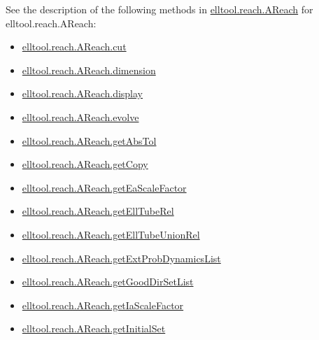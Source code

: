 \documentclass[letterpaper,10pt,english]{sphinxmanual}
\begin{document}
See the description of the following methods in {\hyperref[chap_functions:elltool-reach-areach]{elltool.reach.AReach}} for elltool.reach.AReach:
\begin{itemize}
\item {} 
{\hyperref[chap_functions:elltool-reach-areach-cut]{elltool.reach.AReach.cut}}

\item {} 
{\hyperref[chap_functions:elltool-reach-areach-dimension]{elltool.reach.AReach.dimension}}

\item {} 
{\hyperref[chap_functions:elltool-reach-areach-display]{elltool.reach.AReach.display}}

\item {} 
{\hyperref[chap_functions:elltool-reach-areach-evolve]{elltool.reach.AReach.evolve}}

\item {} 
{\hyperref[chap_functions:elltool-reach-areach-getabstol]{elltool.reach.AReach.getAbsTol}}

\item {} 
{\hyperref[chap_functions:elltool-reach-areach-getcopy]{elltool.reach.AReach.getCopy}}

\item {} 
{\hyperref[chap_functions:elltool-reach-areach-geteascalefactor]{elltool.reach.AReach.getEaScaleFactor}}

\item {} 
{\hyperref[chap_functions:elltool-reach-areach-getelltuberel]{elltool.reach.AReach.getEllTubeRel}}

\item {} 
{\hyperref[chap_functions:elltool-reach-areach-getelltubeunionrel]{elltool.reach.AReach.getEllTubeUnionRel}}

\item {} 
{\hyperref[chap_functions:elltool-reach-areach-getextprobdynamicslist]{elltool.reach.AReach.getExtProbDynamicsList}}

\item {} 
{\hyperref[chap_functions:elltool-reach-areach-getgooddirsetlist]{elltool.reach.AReach.getGoodDirSetList}}

\item {} 
{\hyperref[chap_functions:elltool-reach-areach-getiascalefactor]{elltool.reach.AReach.getIaScaleFactor}}

\item {} 
{\hyperref[chap_functions:elltool-reach-areach-getinitialset]{elltool.reach.AReach.getInitialSet}}


\end{itemize}
\end{document}
